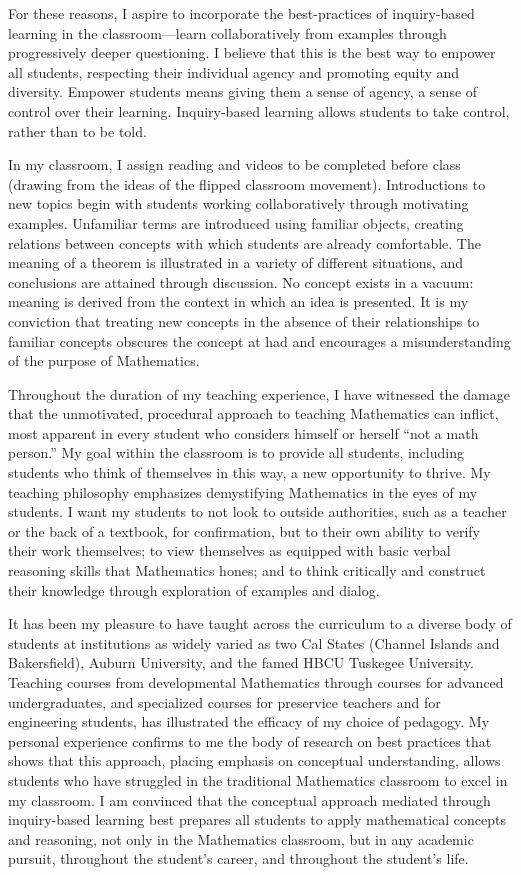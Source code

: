 \documentclass[11pt]{article}
\begin{document}
For these reasons, I aspire to incorporate the best-practices of
inquiry-based learning in the classroom---learn collaboratively from
examples through progressively deeper questioning. I believe that this
is the best way to empower all students, respecting their individual
agency and promoting equity and diversity. Empower students means giving
them a sense of agency, a sense of control over their learning.
Inquiry-based learning allows students to take control, rather than to
be told.

In my classroom, I assign reading and videos to be completed before
class (drawing from the ideas of the flipped classroom movement).
Introductions to new topics begin with students working collaboratively
through motivating examples. Unfamiliar terms are introduced using
familiar objects, creating relations between concepts with which
students are already comfortable. The meaning of a theorem is
illustrated in a variety of different situations, and conclusions are
attained through discussion. No concept exists in a vacuum: meaning is
derived from the context in which an idea is presented. It is my
conviction that treating new concepts in the absence of their
relationships to familiar concepts obscures the concept at had and
encourages a misunderstanding of the purpose of Mathematics.

Throughout the duration of my teaching experience, I have witnessed the
damage that the unmotivated, procedural approach to teaching Mathematics
can inflict, most apparent in every student who considers himself or
herself ``not a math person.'' My goal within the classroom is to
provide all students, including students who think of themselves in this
way, a new opportunity to thrive. My teaching philosophy emphasizes
demystifying Mathematics in the eyes of my students. I want my students
to not look to outside authorities, such as a teacher or the back of a
textbook, for confirmation, but to their own ability to verify their
work themselves; to view themselves as equipped with basic verbal
reasoning skills that Mathematics hones; and to think critically and
construct their knowledge through exploration of examples and dialog.

It has been my pleasure to have taught across the curriculum to a
diverse body of students at institutions as widely varied as two Cal
States (Channel Islands and Bakersfield), Auburn University, and the
famed HBCU Tuskegee University. Teaching courses from developmental
Mathematics through courses for advanced undergraduates, and specialized
courses for preservice teachers and for engineering students, has
illustrated the efficacy of my choice of pedagogy. My personal
experience confirms to me the body of research on best practices that
shows that this approach, placing emphasis on conceptual understanding,
allows students who have struggled in the traditional Mathematics
classroom to excel in my classroom. I am convinced that the conceptual
approach mediated through inquiry-based learning best prepares all
students to apply mathematical concepts and reasoning, not only in the
Mathematics classroom, but in any academic pursuit, throughout the
student's career, and throughout the student's life.
\end{document}
